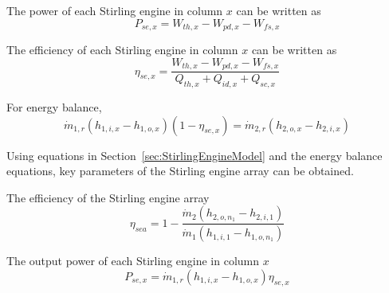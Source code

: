 The power of each Stirling engine in column $x$ can be written as 
\begin{equation}
  P_{se,x} = W_{th,x}-W_{pd,x}-W_{fs,x}
\end{equation}

The efficiency of each Stirling engine in column $x$ can be written as 
\begin{equation}
  \eta_{se,x} = \dfrac{W_{th,x}-W_{pd,x}-W_{fs,x}}{Q_{th,x}+Q_{id,x}+Q_{sc,x}}
\end{equation}



For energy balance,
\begin{equation}
	\dot{m}_{1,r}(h_{1,i,x}-h_{1,o,x})(1-\eta_{se,x})=\dot{m}_{2,r}(h_{2,o,x}-h_{2,i,x})
\end{equation}


Using equations in Section~\ref{sec:StirlingEngineModel} and the energy balance equations, key parameters of the Stirling engine array can be obtained. 

The efficiency of the Stirling engine array 
\begin{equation}
  \eta_{sea}=1-\dfrac{\dot{m}_{2}(h_{2,o,n_1}-h_{2,i,1})}{\dot{m}_{1}(h_{1,i,1}-h_{1,o,n_1})}
\end{equation}

The output power of each Stirling engine in column $x$
\begin{equation}
  P_{se,x}=\dot{m}_{1,r}(h_{1,i,x}-h_{1,o,x})\eta_{se,x}
\end{equation}

